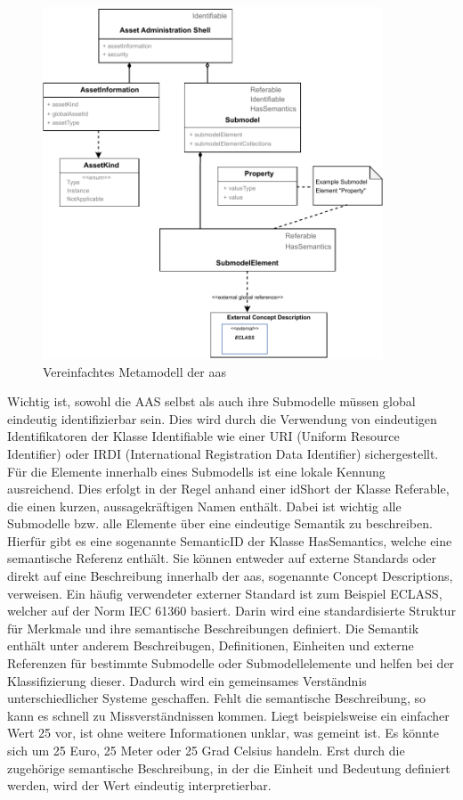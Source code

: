 \newpage
\begin{figure}[htbp]
    \centering
    \includegraphics[width=0.9\textwidth]{Bilder/Metamodell_neu.drawio.pdf}
    \caption{Vereinfachtes Metamodell der \acs{aas}}
    \label{fig:MetamodellAAS}
\end{figure}

Wichtig ist, sowohl die AAS selbst als auch ihre Submodelle müssen global eindeutig identifizierbar sein.
Dies wird durch die Verwendung von eindeutigen Identifikatoren der Klasse Identifiable wie einer URI (Uniform Resource Identifier) oder IRDI (International Registration Data Identifier) sichergestellt.
Für die Elemente innerhalb eines Submodells ist eine lokale Kennung ausreichend. Dies erfolgt in der Regel anhand einer idShort der Klasse Referable, die einen kurzen, aussagekräftigen Namen enthält.
Dabei ist wichtig alle Submodelle bzw. alle Elemente über eine eindeutige Semantik zu beschreiben.
Hierfür gibt es eine sogenannte SemanticID der Klasse HasSemantics, welche eine semantische Referenz enthält.
Sie können entweder auf externe Standards oder direkt auf eine Beschreibung innerhalb der \acs{aas}, sogenannte Concept Descriptions, verweisen.
Ein häufig verwendeter externer Standard ist zum Beispiel ECLASS, welcher auf der Norm IEC 61360 \cite{ECLASSIEC61360} basiert.
Darin wird eine standardisierte Struktur für Merkmale und ihre semantische Beschreibungen definiert.
Die Semantik enthält unter anderem Beschreibugen, Definitionen, Einheiten und externe Referenzen für bestimmte Submodelle oder Submodellelemente und helfen bei der Klassifizierung dieser.
Dadurch wird ein gemeinsames Verständnis unterschiedlicher Systeme geschaffen.
Fehlt die semantische Beschreibung, so kann es schnell zu Missverständnissen kommen.
Liegt beispielsweise ein einfacher Wert 25 vor, ist ohne weitere Informationen unklar, was gemeint ist. 
Es könnte sich um 25 Euro, 25 Meter oder 25 Grad Celsius handeln.
Erst durch die zugehörige semantische Beschreibung, in der die Einheit und Bedeutung definiert werden, wird der Wert eindeutig interpretierbar. 


